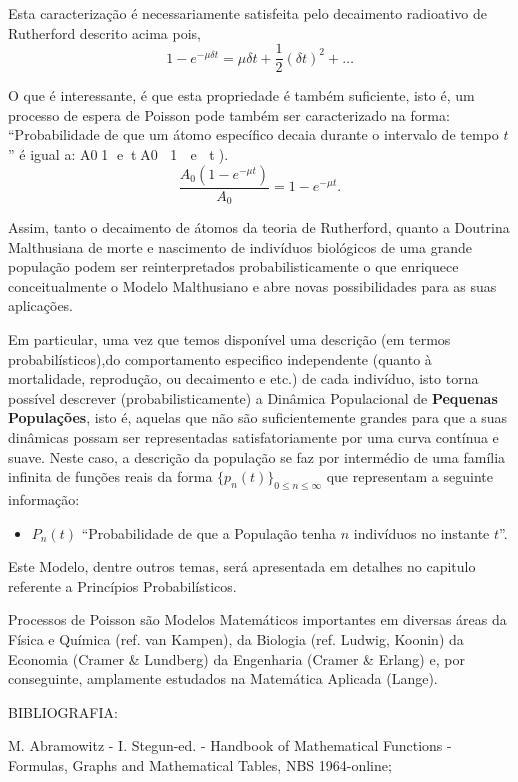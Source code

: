     Esta caracterização é necessariamente satisfeita pelo decaimento radioativo de Rutherford descrito acima pois,
    \[1-e^{-\mu \delta t} = \mu \delta t + \dfrac{1}{2} (\delta t)^2 + \ldots\]

    O que é interessante, é que esta propriedade é também suficiente, isto é, um processo de espera de Poisson pode também ser caracterizado na forma: ``Probabilidade de que um átomo específico decaia durante o intervalo de tempo \(t\)'' é igual a:
    A01 etA0 1  e t).
    \[\dfrac{A_0(1-e^{-\mu t})}{A_0} = 1-e^{-\mu t}.\]


    Assim, tanto o decaimento de átomos da teoria de Rutherford, quanto a Doutrina Malthusiana de morte e nascimento de indivíduos biológicos de uma grande população podem ser reinterpretados probabilisticamente o que enriquece conceitualmente o Modelo Malthusiano e abre novas possibilidades para as suas aplicações.

    Em particular, uma vez que temos disponível uma descrição (em termos probabilísticos),do comportamento especifico independente (quanto à mortalidade, reprodução, ou decaimento e etc.) de cada indivíduo, isto torna possível descrever (probabilisticamente) a Dinâmica Populacional de \textbf{Pequenas Populações}, isto é, aquelas que não são suficientemente grandes para que a suas dinâmicas possam ser representadas satisfatoriamente por uma curva contínua e suave. Neste caso, a descrição da população se faz por intermédio de uma família infinita de funções reais da forma \(\{p_n(t)\}_{0 \le n \le \infty}\) que representam a seguinte informação:
    \begin{itemize}
    \item \(P_n(t)\) ``Probabilidade de que a População tenha \(n\) indivíduos no instante \(t\)''.
    \end{itemize}

    Este Modelo, dentre outros temas, será apresentada em detalhes no capitulo referente a Princípios Probabilísticos.
    
    Processos de Poisson são Modelos Matemáticos importantes em diversas áreas da Física e Química (ref. van Kampen), da Biologia (ref. Ludwig, Koonin) da Economia (Cramer \& Lundberg) da Engenharia (Cramer \& Erlang) e, por conseguinte, amplamente estudados na Matemática Aplicada (Lange).



BIBLIOGRAFIA:

M. Abramowitz - I. Stegun-ed. - Handbook of Mathematical Functions - Formulas, Graphs and Mathematical Tables, NBS 1964-online;

